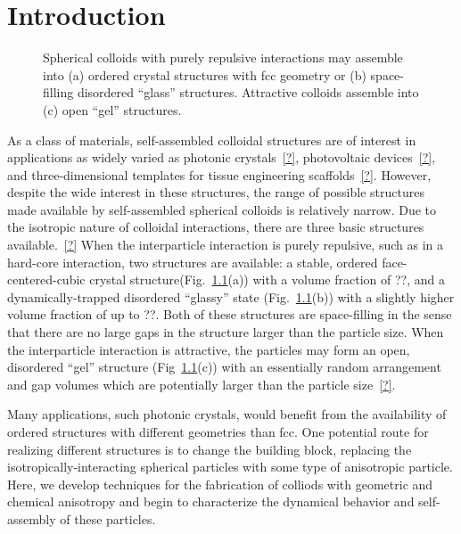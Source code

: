 \chapter{Introduction}

\begin{figure}
\caption{Spherical colloids with purely repulsive interactions may assemble into (a) ordered 
crystal structures with fcc geometry or (b) space-filling disordered ``glass'' structures. Attractive
colloids assemble into (c) open ``gel'' structures.}

\label{fig:isotropic-structs}

\end{figure}

As a class of materials, self-assembled colloidal structures are of interest in applications as widely varied
as photonic crystals~\ref{?}, photovoltaic devices~\ref{?}, and three-dimensional templates for tissue 
engineering scaffolds~\ref{?}. However, despite the wide interest in these structures, the range of possible 
structures made available by self-assembled spherical colloids is relatively narrow.  Due to the isotropic nature
of colloidal interactions, there are three basic structures available.~\ref{?}  When the interparticle interaction is purely 
repulsive, such as in a hard-core interaction, two structures are available: a stable, ordered face-centered-cubic crystal
structure(Fig.~\ref{fig:isotropic-structs}(a)) with a volume fraction of ??, and a dynamically-trapped disordered ``glassy''
state (Fig.~\ref{fig:isotropic-structs}(b)) with a slightly higher volume fraction of up to ??.  Both of these 
structures are space-filling in the sense that there are no large gaps in the structure larger than the 
particle size.  When the interparticle interaction is attractive, the particles may form an open, disordered ``gel'' 
structure (Fig~\ref{fig:isotropic-structs}(c)) 
with an essentially random arrangement and gap volumes which are potentially larger than the particle size~\ref{?}.

Many applications, such photonic crystals, would benefit from the availability of ordered structures with different geometries
than fcc.  One potential route for realizing different structures is to change the building block, replacing the 
isotropically-interacting spherical particles with some type of anisotropic particle.  Here, we develop techniques for
the fabrication of colliods with geometric and chemical anisotropy and begin to characterize the dynamical behavior
and self-assembly of these particles.

